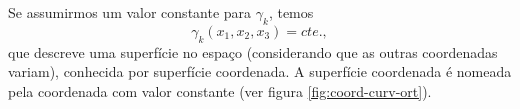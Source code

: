 Se assumirmos um valor constante para $\gamma_{k}$, temos
\begin{equation}
\gamma_{k}(x_1,x_2,x_3)=cte.,    %
\end{equation}
que descreve uma superf\'icie no espa\c{c}o (considerando que as outras coordenadas variam),
conhecida por superf\'icie coordenada.
A superf\'icie coordenada \'e nomeada pela coordenada com valor constante (ver figura \ref{fig:coord-curv-ort}).

